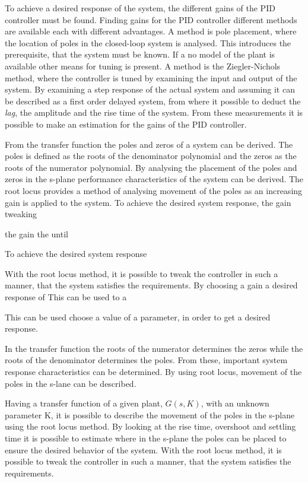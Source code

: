 \documentclass[../../main.tex]{subfiles}
\begin{document}
To achieve a desired response of the system, the different gains of the PID controller must be found. Finding gains for the PID controller different methods are available each with different advantages. A method is pole placement, where the location of poles in the closed-loop system is analysed. This introduces the prerequisite, that the system must be known. If a no model of the plant is available other means for tuning is present. A method is the Ziegler-Nichols method, where the controller is tuned by examining the input and output of the system. By examining a step response of the actual system and assuming it can be described as a first order delayed system, from where it possible to deduct the \textit{lag}, the amplitude and the rise time of the system. From these measurements it is possible to make an estimation for the gains of the PID controller.

From the transfer function the poles and zeros of a system can be derived. The poles is defined as the roots of the denominator polynomial and the zeros as the roots of the numerator polynomial. By analysing the placement of the poles and zeros in the s-plane performance characteristics of the system can be derived. The root locus provides a method of analysing movement of the poles as an increasing gain is applied to the system. To achieve the desired system response, the gain tweaking

the gain the until

To achieve the desired system response

With the root locus method, it is possible to tweak the controller in such a manner, that the system satisfies the requirements.
By choosing a gain a desired response of This can be used to a


This can be used choose a value of a parameter, in order to get a desired response.     

In the transfer function the roots of the numerator determines the zeros while the roots of the denominator determines the poles. From these, important system response characteristics can be determined. By using root locus, movement of the poles in the s-lane can be described.

Having a transfer function of a given plant, $G(s,K)$, with an unknown parameter K, it is possible to describe the movement of the poles in the s-plane using the root locus method. By looking at the rise time, overshoot and settling time it is possible to estimate where in the s-plane the poles can be placed to ensure the desired behavior of the system. %
With the root locus method, it is possible to tweak the controller in such a manner, that the system satisfies the requirements.
\end{document}

